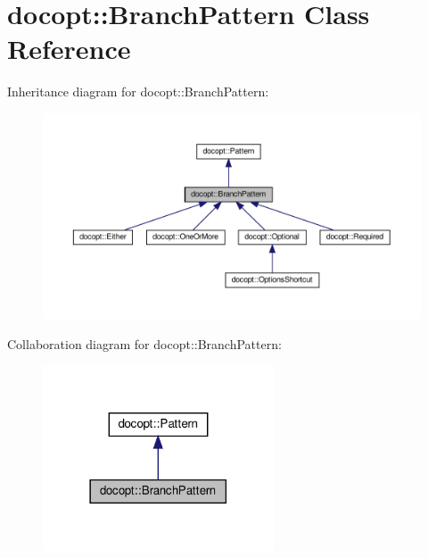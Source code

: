 \hypertarget{classdocopt_1_1BranchPattern}{}\section{docopt\+:\+:Branch\+Pattern Class Reference}
\label{classdocopt_1_1BranchPattern}


Inheritance diagram for docopt\+:\+:Branch\+Pattern\+:
\nopagebreak
\begin{figure}[H]
\begin{center}
\leavevmode
\includegraphics[width=350pt]{classdocopt_1_1BranchPattern__inherit__graph}
\end{center}
\end{figure}


Collaboration diagram for docopt\+:\+:Branch\+Pattern\+:
\nopagebreak
\begin{figure}[H]
\begin{center}
\leavevmode
\includegraphics[width=194pt]{classdocopt_1_1BranchPattern__coll__graph}
\end{center}
\end{figure}
